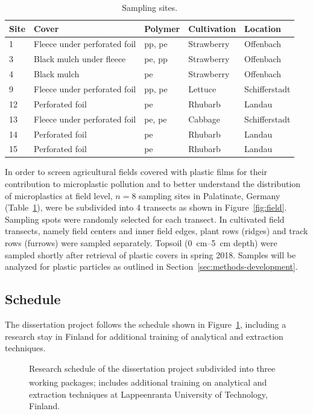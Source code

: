 \documentclass[justified,a4paper,
	nofonts,
	nobib
]{tufte-handout}
\begin{document}
\begin{table}[b]
	\centering\footnotesize
	\caption{Sampling sites.}\label{tab:sites}
	\begin{tabular}{lllll}
		\toprule
		Site & Cover & Polymer & Cultivation & Location \\
		\midrule
		1 & Fleece under perforated foil & \acs{pp}, \acs{pe} & Strawberry & Offenbach \\
		3 & Black mulch under fleece & \acs{pe}, \acs{pp} & Strawberry & Offenbach \\
		4 & Black mulch & \acs{pe} & Strawberry & Offenbach \\
		9 & Fleece under perforated foil & \acs{pp}, \acs{pe} & Lettuce & Schifferstadt \\
		12 & Perforated foil & \acs{pe} & Rhubarb & Landau  \\
		13 & Fleece under perforated foil & \acs{pe}, \acs{pe} & Cabbage & Schifferstadt \\
		14 & Perforated foil & \acs{pe} & Rhubarb & Landau \\
		15 & Perforated foil & \acs{pe} & Rhubarb & Landau \\
		\bottomrule
	\end{tabular}
\end{table}

In order to screen agricultural fields covered with plastic films for their contribution to microplastic pollution and to better understand the distribution of microplastics at field level, $n = 8$ sampling sites in Palatinate, Germany (Table~\ref{tab:sites}), were be subdivided into \num{4} transects as shown in Figure~\ref{fig:field}. Sampling spots were randomly selected for each transect. In cultivated field transects, namely field centers and inner field edges, plant rows (ridges) and track rows (furrows) were sampled separately. Topsoil (\SIrange{0}{5}{\centi\meter} depth) were sampled shortly after retrieval of plastic covers in spring 2018. Samples will be analyzed for plastic particles as outlined in Section~\ref{sec:methods-development}.

\subsection{Schedule}

The dissertation project follows the schedule shown in Figure~\ref{fig:ganttchart}, including a research stay in Finland for additional training of analytical and extraction techniques.

\begin{figure}
	
	\caption{Research schedule of the dissertation project subdivided into three working packages; \textsuperscript{\textdagger} includes additional training on analytical and extraction techniques at Lappeenranta University of Technology, Finland.}
	\label{fig:ganttchart}%
\end{figure}
\end{document}
